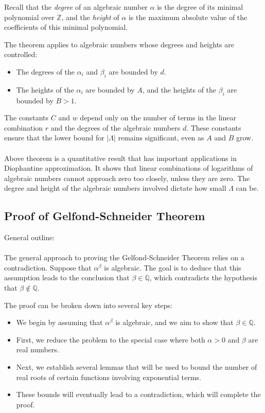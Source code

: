 \documentclass{article}
\begin{document}
Recall that the \emph{degree} of an algebraic number $\alpha$ is the degree of its minimal polynomial over $\mathbb{Z}$, and the \emph{height} of $\alpha$ is the maximum absolute value of the coefficients of this minimal polynomial.

The theorem applies to algebraic numbers whose degrees and heights are controlled:
\begin{itemize}
    \item The degrees of the $\alpha_i$ and $\beta_i$ are bounded by $d$.
    \item The heights of the $\alpha_i$ are bounded by $A$, and the heights of the $\beta_i$ are bounded by $B > 1$.
\end{itemize}

The constants $C$ and $w$ depend only on the number of terms in the linear combination $r$ and the degrees of the algebraic numbers $d$. These constants ensure that the lower bound for $|\Lambda|$ remains significant, even as $A$ and $B$ grow.\\\\
Above theorem is a quantitative result that has important applications in Diophantine approximation. It shows that linear combinations of logarithms of algebraic numbers cannot approach zero too closely, unless they are zero. The degree and height of the algebraic numbers involved dictate how small $\Lambda$ can be.

\subsection{Proof of Gelfond-Schneider Theorem}

General outline: \\\\
The general approach to proving the Gelfond-Schneider Theorem relies on a contradiction. Suppose that $\alpha^\beta$ is algebraic. The goal is to deduce that this assumption leads to the conclusion that $\beta \in \mathbb{Q}$, which contradicts the hypothesis that $\beta \notin \mathbb{Q}$.

The proof can be broken down into several key steps:
\begin{itemize}
    \item We begin by assuming that $\alpha^\beta$ is algebraic, and we aim to show that $\beta \in \mathbb{Q}$.
    \item First, we reduce the problem to the special case where both $\alpha > 0$ and $\beta$ are real numbers.
    \item Next, we establish several lemmas that will be used to bound the number of real roots of certain functions involving exponential terms.
    \item These bounds will eventually lead to a contradiction, which will complete the proof.
\end{itemize}
\end{document}

